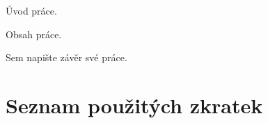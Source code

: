 \documentclass[thesis=B,czech,hidelinks]{src/FITthesisXE}
\begin{document}
\begin{introduction}
\label{introduction}
	Úvod práce.
\end{introduction}

Obsah práce.

\begin{conclusion}
\label{conclusion}
	Sem napište závěr své práce.
\end{conclusion}

\printbibliography[title={Zdroje}]

\appendix

\chapter{Seznam použitých zkratek}
\printglossary[type=\acronymtype,style=acronyms]

%
\end{document}

